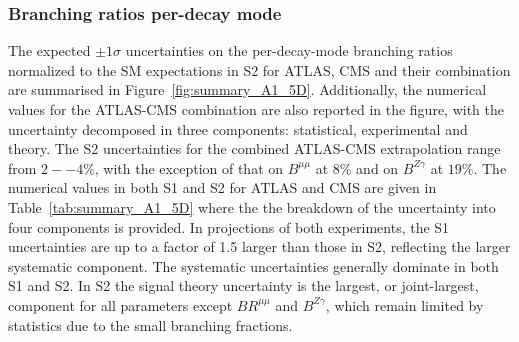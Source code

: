 



\subsubsection{Branching ratios per-decay mode}

The expected $\pm 1\sigma$ uncertainties on the per-decay-mode branching ratios normalized to the SM expectations in S2 for ATLAS, CMS and their combination are summarised in Figure~\ref{fig:summary_A1_5D}.
Additionally, the numerical values for the ATLAS-CMS combination  are also reported in the figure, with the uncertainty decomposed in three components: statistical, experimental and theory.
The S2 uncertainties for the combined ATLAS-CMS extrapolation range from $2--4\%$, with the exception of that on $B^{\mu\mu}$ at $8\%$ and on $B^{Z\gamma}$ at $19\%$.
The numerical values in both S1 and S2 for ATLAS and CMS are given in Table~\ref{tab:summary_A1_5D} where the the breakdown of the uncertainty into four components  is provided. 
In projections of both experiments, the S1 uncertainties are up to a factor of 1.5 larger than those in S2, reflecting the larger systematic component. 
 The systematic uncertainties generally dominate in both S1 and S2. In S2 the signal theory uncertainty is the largest, or joint-largest, component for all parameters except $BR^{\mu\mu}$ and $B^{Z\gamma}$, which remain limited by statistics due to the small  branching fractions. %


